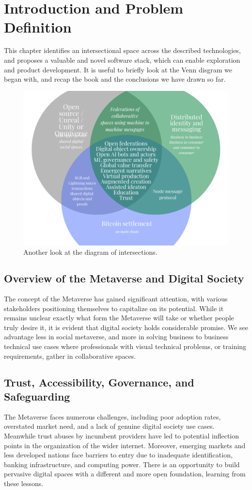 \section{Introduction and Problem Definition}
This chapter identifies an intersectional space across the described technologies, and proposes a valuable and novel software stack, which can enable exploration  and product development. It is useful to briefly look at the Venn disgram we began with, and recap the book and the conclusions we have drawn so far.

\begin{figure}[ht]\centering %
	\includegraphics{landscapevenn}
	\caption{Another look at the diagram of intersections.}
	\label{fig:landscapevenn}
\end{figure}

\subsection{Overview of the Metaverse and Digital Society}
The concept of the Metaverse has gained significant attention, with various stakeholders positioning themselves to capitalize on its potential. While it remains unclear exactly what form the Metaverse will take or whether people truly desire it, it is evident that digital society holds considerable promise. We see advantage less in social metaverse, and more in solving business to business technical use cases where professionals with visual technical problems, or training requirements, gather in collaborative spaces.

\subsection{Trust, Accessibility, Governance, and Safeguarding}
The Metaverse faces numerous challenges, including poor adoption rates, overstated market need, and a lack of genuine digital society use cases. Meanwhile trust abuses by incumbent providers have led to potential inflection points in the organization of the wider internet. Moreover, emerging markets and less developed nations face barriers to entry due to inadequate identification, banking infrastructure, and computing power. There is an opportunity to build pervasive digital spaces with a different and more open foundation, learning from these lessons.

